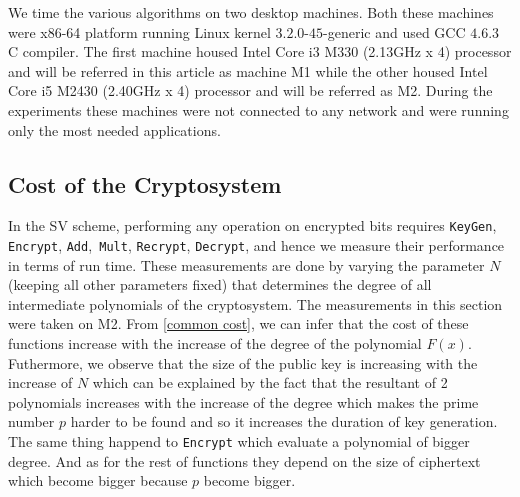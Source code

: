 \documentclass{acm_proc_article-sp}
\begin{document}
We time the various algorithms on two desktop machines. Both these machines were x86-64 platform running Linux kernel $3.2.0$-$45$-generic  and used GCC $4.6.3$ C compiler.  The first machine housed Intel Core i3 M330 (2.13GHz x 4) processor and will be referred in this article as machine M1 while the other housed Intel Core i5 M2430 (2.40GHz x 4) processor and will be referred as M2. During the experiments these machines were not connected to any network and were running only the most needed applications.
 
\subsection{Cost of the Cryptosystem}
 In the SV scheme, performing any operation on encrypted bits requires  \texttt{KeyGen}, \texttt{Encrypt}, \texttt{Add},\texttt{ Mult}, \texttt{Recrypt}, \texttt{Decrypt}, and hence we measure their performance in terms of run time. These measurements are done by varying the parameter $N$(keeping all other parameters fixed) that determines the degree of all intermediate polynomials of the cryptosystem. The measurements in this section were taken on M2. From \autoref{common cost}, we can infer that the cost of these functions increase with the increase of the degree of the polynomial $F(x)$. Futhermore, we observe that the size of the public key is increasing with the increase of $N$ which can be explained by the fact that the resultant of 2 polynomials increases with the increase of the degree which makes the prime number $p$ harder to be found and so it increases the duration of key generation. The same thing happend to \texttt{Encrypt} which evaluate a polynomial of bigger degree. And as for the rest of functions they depend on the size of ciphertext which become bigger because $p$ become bigger.

\begin{table}[htb]
  \centering
  \caption{Run time (ms)}
\end{table}
\end{document}
